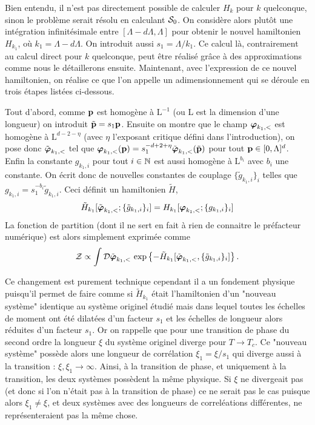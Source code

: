 \documentclass[10.5pt]{article}
\begin{document}
\begin{multicols}{2}
Bien entendu, il n'est pas directement possible de calculer $H_k$ pour $k$ quelconque, sinon le problème serait résolu en calculant $\mathcal{S}_0$. On considère alors plutôt une intégration infinitésimale entre $[\Lambda - d\Lambda, \Lambda]$ pour obtenir le nouvel hamiltonien $H_{k_1}$, où $k_1 = \Lambda - d\Lambda$. On introduit aussi $s_1 = \Lambda/k_1$. Ce calcul là, contrairement au calcul direct pour $k$ quelconque, peut être réalisé grâce à des approximations comme nous le détaillerons ensuite. Maintenant, avec l'expression de ce nouvel hamiltonien, on réalise ce que l'on appelle un adimensionnement qui se déroule en trois étapes listées ci-dessous.

 Tout d'abord, comme ${\bf p}$ est homogène à $\text{L}^{-1}$ (ou L est la dimension d'une longueur) on introduit $\tilde{{\bf p}} = s_1 {\bf p}$. Ensuite on montre que le champ $\boldsymbol{ \varphi}_{k_1, <}$ est homogène à $\text{L}^{d-2-\eta}$ (avec $\eta$ l'exposant critique défini dans l'introduction), on pose donc $\tilde{\boldsymbol{ \varphi}}_{k_1, <}$ tel que $\boldsymbol{ \varphi}_{k_1, <}({\bf p}) = s_1^{-d+2+\eta} \tilde{\boldsymbol{ \varphi}}_{k_1, <}(\tilde{{\bf p}})$ pour tout ${\bf p} \in [0, \Lambda]^d$. Enfin la constante $g_{k_1, i}$ pour tout $i\in \mathbb{N}$ est aussi homogène à $\text{L}^{b_i}$ avec $b_i$ une constante. On écrit donc de nouvelles constantes de couplage $\{\tilde{g}_{k_1, i}\}_i$ telles que $g_{k_1, i} = s_1^{-b_i} \tilde{g}_{k_1, i}$. Ceci définit un hamiltonien $\tilde{H}$,
 \begin{equation}
 	\tilde{H}_{k_1}[\tilde{\boldsymbol{ \varphi}}_{k_1,<}; \{\tilde{g}_{k_1, i}\}_i ] = H_{k_1}[\boldsymbol{ \varphi}_{k_1,<}; \{g_{k_1,i}\}_i]
 \end{equation}
La fonction de partition (dont il ne sert en fait à rien de connaitre le préfacteur numérique) est alors simplement exprimée comme 
\begin{equation}
\mathcal{Z} \propto \int \mathcal{D} \tilde{\boldsymbol{ \varphi}}_{k_1,<} \, \exp\left\{- \tilde{H}_{k_1}[\tilde{\boldsymbol{ \varphi}}_{k_1,<}, \{\tilde{g}_{k_1, i}\}_i ] \right\}. 
\end{equation} 


Ce changement est purement technique cependant il a un fondement physique puisqu'il permet de faire comme si $\tilde{H}_{k_1}$ était l'hamiltonien d'un "nouveau système" identique au système originel étudié mais dans lequel toutes les échelles de moment ont été dilatées d'un facteur $s_1$ et les échelles de longueur alors réduites d'un facteur $s_1$. Or on rappelle que pour une transition de phase du second ordre la longueur $\xi$ du système originel diverge pour $T \to T_c$. Ce "nouveau système" possède alors une longueur de corrélation $\xi_1 = \xi/s_1$ qui diverge aussi à la transition : $\xi, \xi_1 \to \infty$. Ainsi, à la transition de phase, et uniquement à la transition, les deux systèmes possèdent la même physique. Si $\xi$ ne divergeait pas (et donc si l'on n'était pas à la transition de phase) ce ne serait pas le cas puisque alors $\xi_1 \neq \xi$, et deux systèmes avec des longueurs de correléations différentes, ne représenteraient pas la même chose. \\


\end{multicols}
\end{document}
